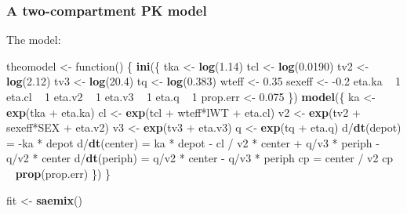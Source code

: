 \documentclass[]{book}
\newenvironment{Shaded}{\begin{snugshade}}{\end{snugshade}}
\newcommand{\KeywordTok}[1]{\textcolor[rgb]{0.13,0.29,0.53}{\textbf{{#1}}}}
\newcommand{\DecValTok}[1]{\textcolor[rgb]{0.00,0.00,0.81}{{#1}}}
\newcommand{\FloatTok}[1]{\textcolor[rgb]{0.00,0.00,0.81}{{#1}}}
\newcommand{\StringTok}[1]{\textcolor[rgb]{0.31,0.60,0.02}{{#1}}}
\newcommand{\NormalTok}[1]{{#1}}
\begin{document}
\subsubsection{A two-compartment PK
model}\label{a-two-compartment-pk-model}

The model:

\begin{Shaded}
\begin{Highlighting}[]
\NormalTok{theomodel <-}\StringTok{ }\NormalTok{function() \{}
  \KeywordTok{ini}\NormalTok{(\{}
    \NormalTok{tka <-}\StringTok{ }\KeywordTok{log}\NormalTok{(}\FloatTok{1.14}\NormalTok{)}
    \NormalTok{tcl <-}\StringTok{ }\KeywordTok{log}\NormalTok{(}\FloatTok{0.0190}\NormalTok{)}
    \NormalTok{tv2  <-}\StringTok{ }\KeywordTok{log}\NormalTok{(}\FloatTok{2.12}\NormalTok{)}
    \NormalTok{tv3  <-}\StringTok{ }\KeywordTok{log}\NormalTok{(}\FloatTok{20.4}\NormalTok{)}
    \NormalTok{tq   <-}\StringTok{ }\KeywordTok{log}\NormalTok{(}\FloatTok{0.383}\NormalTok{)}
    \NormalTok{wteff  <-}\StringTok{ }\FloatTok{0.35}
    \NormalTok{sexeff <-}\StringTok{ }\NormalTok{-}\FloatTok{0.2}
    \NormalTok{eta.ka ~}\StringTok{ }\DecValTok{1}
    \NormalTok{eta.cl ~}\StringTok{ }\DecValTok{1}
    \NormalTok{eta.v2 ~}\StringTok{ }\DecValTok{1}
    \NormalTok{eta.v3 ~}\StringTok{ }\DecValTok{1}
    \NormalTok{eta.q ~}\StringTok{ }\DecValTok{1}
    \NormalTok{prop.err <-}\StringTok{ }\FloatTok{0.075}
  \NormalTok{\})}
  \KeywordTok{model}\NormalTok{(\{}
    \NormalTok{ka <-}\StringTok{ }\KeywordTok{exp}\NormalTok{(tka +}\StringTok{ }\NormalTok{eta.ka)}
    \NormalTok{cl <-}\StringTok{ }\KeywordTok{exp}\NormalTok{(tcl +}\StringTok{ }\NormalTok{wteff*lWT +}\StringTok{ }\NormalTok{eta.cl)}
    \NormalTok{v2 <-}\StringTok{ }\KeywordTok{exp}\NormalTok{(tv2 +}\StringTok{ }\NormalTok{sexeff*SEX +}\StringTok{ }\NormalTok{eta.v2)}
    \NormalTok{v3 <-}\StringTok{ }\KeywordTok{exp}\NormalTok{(tv3 +}\StringTok{ }\NormalTok{eta.v3)}
    \NormalTok{q  <-}\StringTok{ }\KeywordTok{exp}\NormalTok{(tq +}\StringTok{ }\NormalTok{eta.q)}
    \NormalTok{d/}\KeywordTok{dt}\NormalTok{(depot) =}\StringTok{ }\NormalTok{-ka *}\StringTok{ }\NormalTok{depot}
    \NormalTok{d/}\KeywordTok{dt}\NormalTok{(center) =}\StringTok{ }\NormalTok{ka *}\StringTok{ }\NormalTok{depot -}\StringTok{ }\NormalTok{cl /}\StringTok{ }\NormalTok{v2 *}\StringTok{ }\NormalTok{center +}\StringTok{ }\NormalTok{q/v3 *}\StringTok{ }\NormalTok{periph -}\StringTok{ }\NormalTok{q/v2 *}\StringTok{ }\NormalTok{center}
    \NormalTok{d/}\KeywordTok{dt}\NormalTok{(periph) =}\StringTok{ }\NormalTok{q/v2 *}\StringTok{ }\NormalTok{center -}\StringTok{ }\NormalTok{q/v3 *}\StringTok{ }\NormalTok{periph}
    \NormalTok{cp =}\StringTok{ }\NormalTok{center /}\StringTok{ }\NormalTok{v2}
    \NormalTok{cp ~}\StringTok{ }\KeywordTok{prop}\NormalTok{(prop.err)}
  \NormalTok{\})}
\NormalTok{\}}

\NormalTok{fit <-}\StringTok{ }\KeywordTok{saemix}\NormalTok{()}
\end{Highlighting}
\end{Shaded}
\end{document}
